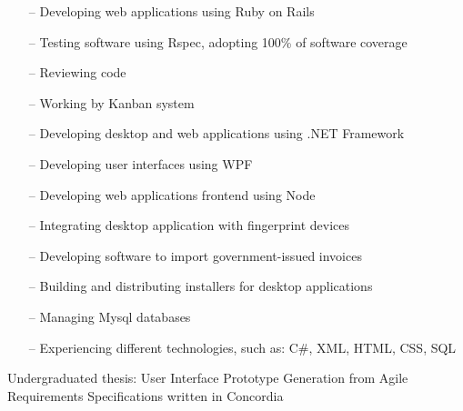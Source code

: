 \documentclass[12pt,a4paper]{altacv}
\begin{document}
\begin{paracol}{2}
\medskip


\begin{itemize}
  \setlength{\itemindent}{1em}
\item[--] {Developing web applications using Ruby on Rails}
\item[--] {Testing software using Rspec, adopting 100\% of software coverage}
\item[--] {Reviewing code}
\item[--] {Working by Kanban system}
\end{itemize}

\medskip


\begin{itemize}
  \setlength{\itemindent}{1em}
\item[--] {Developing desktop and web applications using .NET Framework}
\item[--] {Developing user interfaces using WPF}
\item[--] {Developing web applications frontend using Node}
\item[--] {Integrating desktop application with fingerprint devices}
\item[--] {Developing software to import government-issued invoices}
\item[--] {Building and distributing installers for desktop applications}
\item[--] {Managing Mysql databases}
\item[--] {Experiencing different technologies, such as: C\#, XML, HTML, CSS, SQL}
\end{itemize}

\pagebreak





Undergraduated thesis: User Interface Prototype Generation from Agile Requirements Specifications written in Concordia


\end{paracol}
\end{document}
